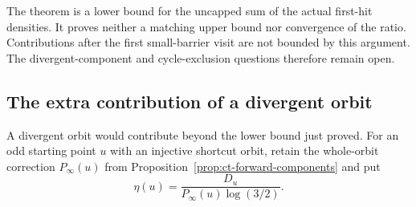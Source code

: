 \documentclass[11pt,a4paper]{article}
\begin{document}
The theorem is a lower bound for the uncapped sum of the actual
first-hit densities. It proves neither a matching upper bound nor
convergence of the ratio. Contributions after the first small-barrier
visit are not bounded by this argument. The divergent-component and
cycle-exclusion questions therefore remain open.


\subsection{The extra contribution of a divergent orbit}
\label{sec:ct-raw-divergent-excess}

A divergent orbit would contribute beyond the lower bound just proved.
For an odd starting point \(u\) with an injective shortcut orbit, retain
the whole-orbit correction \(P_\infty(u)\) from
Proposition~\ref{prop:ct-forward-components} and put
\[
 \eta(u)=\frac{D_u}{P_\infty(u)\log(3/2)}.
\]
\end{document}
